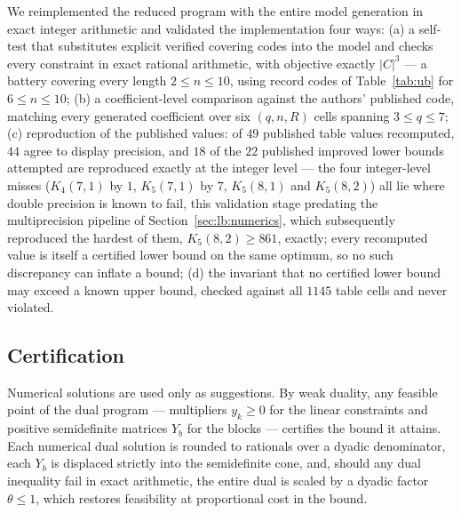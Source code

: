 \documentclass[11pt]{amsart}
\newcommand{\Kq}[3]{K_{#1}(#2,#3)}
\begin{document}
We reimplemented the reduced program with the entire model generation in
exact integer arithmetic and validated the implementation four ways:
(a) a self-test that substitutes explicit verified covering codes into the
model and checks every constraint in exact rational arithmetic, with
objective exactly $|C|^3$ --- a battery covering every length
$2\le n\le 10$, using record codes of Table~\ref{tab:ub} for
$6\le n\le 10$; (b) a coefficient-level comparison against the
authors' published code, matching every generated coefficient over six
$(q,n,R)$ cells spanning $3\le q\le 7$; (c) reproduction of the published
values: of $49$ published table values recomputed, $44$ agree to display
precision, and $18$ of the $22$ published improved lower bounds attempted
are reproduced exactly at the integer level --- the four integer-level
misses ($\Kq{4}{7}{1}$ by $1$, $\Kq{5}{7}{1}$ by $7$, $\Kq{5}{8}{1}$ and
$\Kq{5}{8}{2}$) all lie where double precision is known to fail, this
validation stage predating the multiprecision pipeline of
Section~\ref{sec:lb:numerics}, which subsequently reproduced the hardest
of them, $\Kq{5}{8}{2}\ge 861$, exactly; every recomputed value is itself
a certified lower bound on the same optimum, so no such discrepancy can
inflate a bound; (d) the invariant that no
certified lower bound may exceed a known upper bound, checked against all
$1145$ table cells and never violated.

\subsection{Certification}\label{sec:lb:cert}

Numerical solutions are used only as suggestions. By weak duality, any
feasible point of the dual program --- multipliers $y_k\ge 0$ for the
linear constraints and positive semidefinite matrices $Y_b$ for the blocks
--- certifies the bound it attains. Each numerical dual solution is rounded
to rationals over a dyadic denominator, each $Y_b$ is displaced strictly
into the semidefinite cone, and, should any dual inequality fail in exact
arithmetic, the entire dual is scaled by a dyadic factor $\theta\le 1$,
which restores feasibility at proportional cost in the bound.
\end{document}
